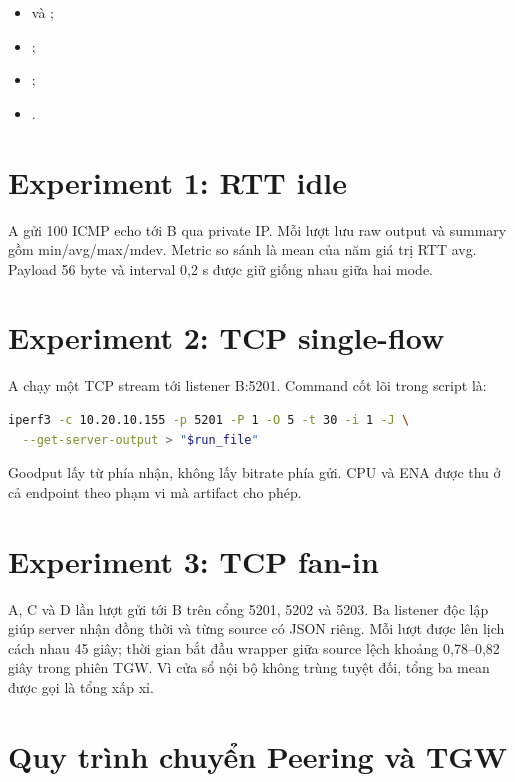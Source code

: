 \begin{itemize}
  \item {} và ;
  \item {};
  \item {};
  \item {}.
\end{itemize}

\section{Experiment 1: RTT idle}

A gửi 100 ICMP echo tới B qua private IP. Mỗi lượt lưu raw output và summary
gồm min/avg/max/mdev. Metric so sánh là mean của năm giá trị RTT avg. Payload
56 byte và interval 0,2 s được giữ giống nhau giữa hai mode.

\section{Experiment 2: TCP single-flow}

A chạy một TCP stream tới listener B:5201. Command cốt lõi trong script là:

\begin{lstlisting}[language=bash,caption={Lệnh TCP single-flow cốt lõi},label={lst:tcp-single}]
iperf3 -c 10.20.10.155 -p 5201 -P 1 -O 5 -t 30 -i 1 -J \
  --get-server-output > "$run_file"
\end{lstlisting}

Goodput lấy từ phía nhận, không lấy bitrate phía gửi. CPU và ENA được thu ở
cả endpoint theo phạm vi mà artifact cho phép.

\section{Experiment 3: TCP fan-in}

A, C và D lần lượt gửi tới B trên cổng 5201, 5202 và 5203. Ba listener độc
lập giúp server nhận đồng thời và từng source có JSON riêng. Mỗi lượt được lên
lịch cách nhau 45 giây; thời gian bắt đầu wrapper giữa source lệch khoảng
0,78--0,82 giây trong phiên TGW. Vì cửa sổ nội bộ không trùng tuyệt đối, tổng
ba mean được gọi là tổng xấp xỉ.

\section{Quy trình chuyển Peering và TGW}

